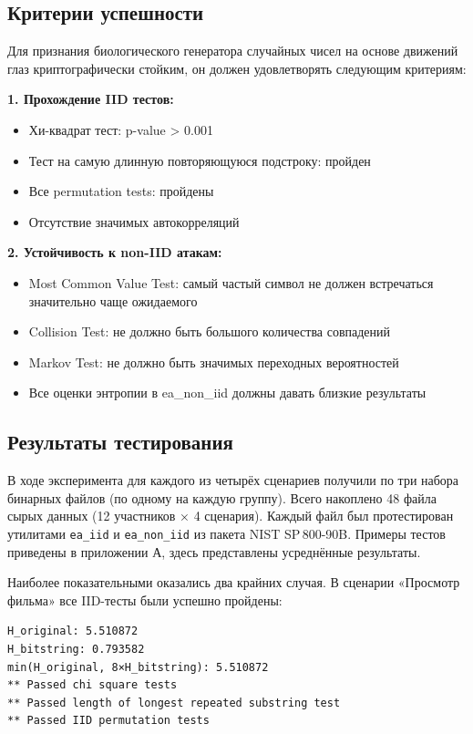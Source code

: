 \documentclass[14pt, a4paper]{extreport}
\begin{document}
\subsection{Критерии успешности}

Для признания биологического генератора случайных чисел на основе движений глаз криптографически стойким, он должен удовлетворять следующим критериям:

\textbf{1. Прохождение IID тестов:}
\begin{itemize}
    \item Хи-квадрат тест: p-value > 0.001
    \item Тест на самую длинную повторяющуюся подстроку: пройден
    \item Все permutation tests: пройдены
    \item Отсутствие значимых автокорреляций
\end{itemize}
\textbf{2. Устойчивость к non-IID атакам:}
\begin{itemize}
    \item Most Common Value Test: самый частый символ не должен встречаться значительно чаще ожидаемого
    \item Collision Test: не должно быть большого количества совпадений
    \item Markov Test: не должно быть значимых переходных вероятностей
    \item Все оценки энтропии в ea\_non\_iid должны давать близкие результаты
\end{itemize}
\newpage
\subsection{Результаты тестирования}

В ходе эксперимента для каждого из четырёх сценариев получили по три набора бинарных файлов (по одному на каждую группу). Всего накоплено 48 файла сырых данных (12 участников × 4 сценария). Каждый файл был протестирован утилитами \texttt{ea\_iid} и \texttt{ea\_non\_iid} из пакета NIST SP 800-90B. Примеры тестов приведены в приложении А, здесь представлены усреднённые результаты.

Наиболее показательными оказались два крайних случая. В сценарии «Просмотр фильма» все IID-тесты были успешно пройдены:

\begin{verbatim}
H_original: 5.510872
H_bitstring: 0.793582
min(H_original, 8×H_bitstring): 5.510872
** Passed chi square tests
** Passed length of longest repeated substring test
** Passed IID permutation tests
\end{verbatim}
\end{document}
